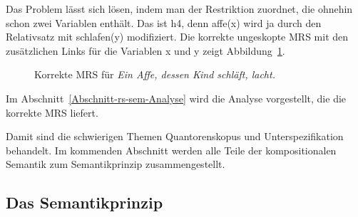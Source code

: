 %

Das Problem lässt sich lösen, indem man  der Restriktion zuordnet, die ohnehin schon zwei
Variablen enthält. Das ist h4, denn affe(x) wird ja durch den Relativsatz mit schlafen(y)
modifiziert. Die korrekte ungeskopte MRS mit den zusätzlichen Links für die Variablen x und y zeigt Abbildung~\ref{Abbildung dessen Kind}.
\begin{figure}
\caption{Korrekte MRS für \emph{Ein Affe, dessen Kind schläft, lacht.}}\label{Abbildung dessen Kind}
\end{figure}
Im Abschnitt~\ref{Abschnitt-rs-sem-Analyse} wird die Analyse vorgestellt, die die korrekte MRS liefert. 

Damit sind die schwierigen Themen Quantorenskopus und Unterspezifikation behandelt. Im kommenden
Abschnitt werden alle Teile der kompositionalen Semantik zum Semantikprinzip zusammengestellt.

\subsection{Das Semantikprinzip}
\label{Abschnitt-Semantikprinzip}

